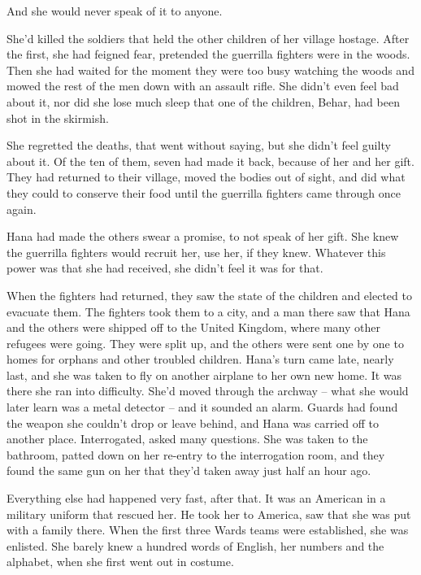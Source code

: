 And she would never speak of it to anyone.



She'd killed the soldiers that held the other children of her village hostage.  After the first, she had feigned fear, pretended the guerrilla fighters were in the woods.  Then she had waited for the moment they were too busy watching the woods and mowed the rest of the men down with an assault rifle.  She didn't even feel bad about it, nor did she lose much sleep that one of the children, Behar, had been shot in the skirmish.



She regretted the deaths, that went without saying, but she didn't feel guilty about it.  Of the ten of them, seven had made it back, because of her and her gift.  They had returned to their village, moved the bodies out of sight, and did what they could to conserve their food until the guerrilla fighters came through once again.



Hana had made the others swear a promise, to not speak of her gift.  She knew the guerrilla fighters would recruit her, use her, if they knew.  Whatever this power was that she had received, she didn't feel it was for that.



When the fighters had returned, they saw the state of the children and elected to evacuate them.  The fighters took them to a city, and a man there saw that Hana and the others were shipped off to the United Kingdom, where many other refugees were going.  They were split up, and the others were sent one by one to homes for orphans and other troubled children.  Hana's turn came late, nearly last, and she was taken to fly on another airplane to her own new home.  It was there she ran into difficulty.  She'd moved through the archway – what she would later learn was a metal detector – and it sounded an alarm.  Guards had found the weapon she couldn't drop or leave behind, and Hana was carried off to another place.  Interrogated, asked many questions.  She was taken to the bathroom, patted down on her re-entry to the interrogation room, and they found the same gun on her that they'd taken away just half an hour ago.



Everything else had happened very fast, after that.  It was an American in a military uniform that rescued her.  He took her to America, saw that she was put with a family there.  When the first three Wards teams were established, she was enlisted.  She barely knew a hundred words of English, her numbers and the alphabet, when she first went out in costume.



